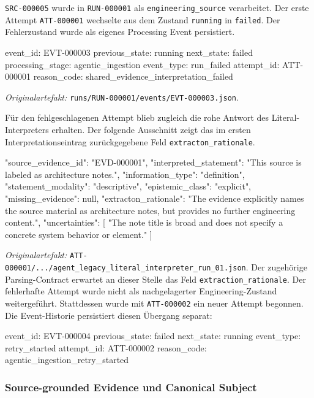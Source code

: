 \texttt{SRC-000005} wurde in \texttt{RUN-000001} als
\texttt{engineering\_source} verarbeitet. Der erste Attempt
\texttt{ATT-000001} wechselte aus dem Zustand \texttt{running} in
\texttt{failed}. Der Fehlerzustand wurde als eigenes Processing Event
persistiert.

\begin{evidencebox}
event_id:         EVT-000003
previous_state:   running
next_state:       failed
processing_stage: agentic_ingestion
event_type:       run_failed
attempt_id:       ATT-000001
reason_code:      shared_evidence_interpretation_failed
\end{evidencebox}

\noindent\textit{Originalartefakt:}
\texttt{runs/RUN-000001/events/EVT-000003.json}.

Für den fehlgeschlagenen Attempt blieb zugleich die rohe Antwort des
Literal-Interpreters erhalten. Der folgende Ausschnitt zeigt das im ersten
Interpretationseintrag zurückgegebene Feld \texttt{extracton\_rationale}.

\begin{evidencebox}
{
  "source_evidence_id": "EVD-000001",
  "interpreted_statement": "This source is labeled as architecture notes.",
  "information_type": "definition",
  "statement_modality": "descriptive",
  "epistemic_class": "explicit",
  "missing_evidence": null,
  "extracton_rationale": "The evidence explicitly names the source material as architecture notes, but provides no further engineering content.",
  "uncertainties": [
    "The note title is broad and does not specify a concrete system behavior or element."
  ]
}
\end{evidencebox}

\noindent\textit{Originalartefakt:}
\texttt{ATT-000001/.../agent\_legacy\_literal\_interpreter\_run\_01.json}.
Der zugehörige Parsing-Contract erwartet an dieser Stelle das Feld
\texttt{extraction\_rationale}. Der fehlerhafte Attempt wurde nicht als
nachgelagerter Engineering-Zustand weitergeführt. Stattdessen wurde mit
\texttt{ATT-000002} ein neuer Attempt begonnen. Die Event-Historie persistiert
diesen Übergang separat:

\begin{evidencebox}
event_id:       EVT-000004
previous_state: failed
next_state:     running
event_type:     retry_started
attempt_id:     ATT-000002
reason_code:    agentic_ingestion_retry_started
\end{evidencebox}

\subsubsection{Source-grounded Evidence und Canonical Subject}

